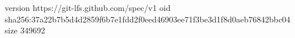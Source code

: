 version https://git-lfs.github.com/spec/v1
oid sha256:37a22b7b5d4d2859f6b7e1fdd2f0eed46903ee71f3be3d1f8d0aeb76842bbc04
size 349692
